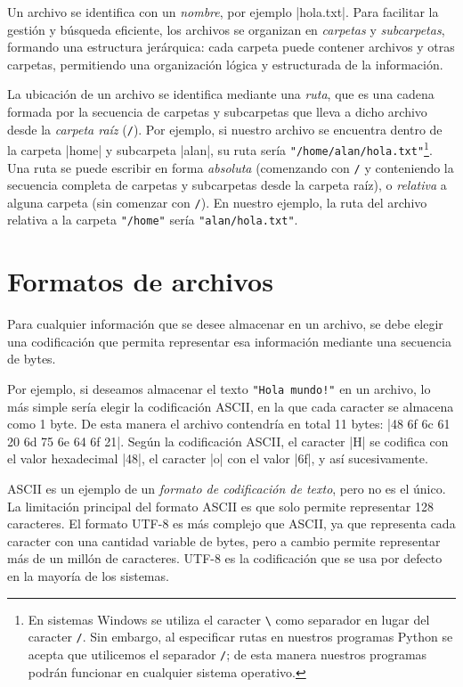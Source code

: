 Un archivo se identifica con un \emph{nombre}, por ejemplo |hola.txt|. Para
facilitar la gestión y búsqueda eficiente, los archivos se organizan en
\emph{carpetas} y \emph{subcarpetas}, formando una estructura jerárquica: cada
carpeta puede contener archivos y otras carpetas, permitiendo una organización
lógica y estructurada de la información.

La ubicación de un archivo se identifica mediante una \emph{ruta}, que es una
cadena formada por la secuencia de carpetas y subcarpetas que lleva a dicho
archivo desde la \emph{carpeta raíz} (\lstinline!/!). Por ejemplo, si nuestro
archivo se encuentra dentro de la carpeta |home| y subcarpeta |alan|, su ruta
sería \verb!"/home/alan/hola.txt"!\footnote{En sistemas Windows se utiliza el
caracter {\tt \textbackslash} como separador en lugar del caracter
\lstinline!/!. Sin embargo, al especificar rutas en nuestros programas Python
se acepta que utilicemos el separador \lstinline!/!; de esta manera nuestros
programas podrán funcionar en cualquier sistema operativo.}. Una ruta se puede
escribir en forma \emph{absoluta} (comenzando con \lstinline!/! y conteniendo
la secuencia completa de carpetas y subcarpetas desde la carpeta raíz), o
\emph{relativa} a alguna carpeta (sin comenzar con \lstinline!/!). En nuestro
ejemplo, la ruta del archivo relativa a la carpeta \verb!"/home"! sería
\verb!"alan/hola.txt"!.

\section{Formatos de archivos}

Para cualquier información que se desee almacenar en un archivo, se debe elegir
una codificación que permita representar esa información mediante una secuencia
de bytes.

Por ejemplo, si deseamos almacenar el texto \texttt{"Hola mundo!"} en un archivo, lo
más simple sería elegir la codificación ASCII, en la que cada caracter se
almacena como 1 byte. De esta manera el archivo contendría en total 11 bytes:
|48 6f 6c 61 20 6d 75 6e 64 6f 21|.
Según la codificación ASCII, el caracter |H| se codifica con el valor
hexadecimal |48|, el caracter |o| con el valor |6f|, y así sucesivamente.

ASCII es un ejemplo de un \emph{formato de codificación de texto}, pero no es
el único. La limitación principal del formato ASCII es que solo permite
representar 128 caracteres. El formato UTF-8 es más complejo que ASCII,
ya que representa cada caracter con una cantidad variable de bytes, pero a
cambio permite representar más de un millón de caracteres. UTF-8 es la codificación
que se usa por defecto en la mayoría de los sistemas.

